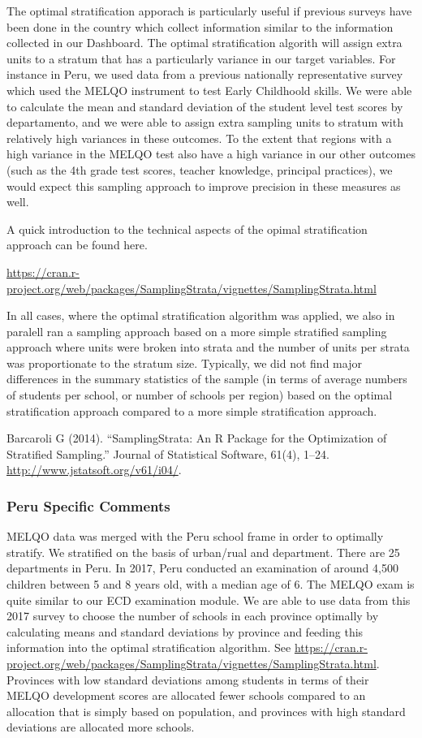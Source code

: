 \documentclass[]{article}
\begin{document}
The optimal stratification apporach is particularly useful if previous
surveys have been done in the country which collect information similar
to the information collected in our Dashboard. The optimal
stratification algorith will assign extra units to a stratum that has a
particularly variance in our target variables. For instance in Peru, we
used data from a previous nationally representative survey which used
the MELQO instrument to test Early Childhoold skills. We were able to
calculate the mean and standard deviation of the student level test
scores by departamento, and we were able to assign extra sampling units
to stratum with relatively high variances in these outcomes. To the
extent that regions with a high variance in the MELQO test also have a
high variance in our other outcomes (such as the 4th grade test scores,
teacher knowledge, principal practices), we would expect this sampling
approach to improve precision in these measures as well.

A quick introduction to the technical aspects of the opimal
stratification approach can be found here.

\url{https://cran.r-project.org/web/packages/SamplingStrata/vignettes/SamplingStrata.html}

In all cases, where the optimal stratification algorithm was applied, we
also in paralell ran a sampling approach based on a more simple
stratified sampling approach where units were broken into strata and the
number of units per strata was proportionate to the stratum size.
Typically, we did not find major differences in the summary statistics
of the sample (in terms of average numbers of students per school, or
number of schools per region) based on the optimal stratification
approach compared to a more simple stratification approach.

Barcaroli G (2014). ``SamplingStrata: An R Package for the Optimization
of Stratified Sampling.'' Journal of Statistical Software, 61(4), 1--24.
\url{http://www.jstatsoft.org/v61/i04/}.

\hypertarget{peru-specific-comments}{%
\subsubsection{Peru Specific Comments}\label{peru-specific-comments}}

MELQO data was merged with the Peru school frame in order to optimally
stratify. We stratified on the basis of urban/rual and department. There
are 25 departments in Peru. In 2017, Peru conducted an examination of
around 4,500 children between 5 and 8 years old, with a median age of 6.
The MELQO exam is quite similar to our ECD examination module. We are
able to use data from this 2017 survey to choose the number of schools
in each province optimally by calculating means and standard deviations
by province and feeding this information into the optimal stratification
algorithm. See
\url{https://cran.r-project.org/web/packages/SamplingStrata/vignettes/SamplingStrata.html}.
Provinces with low standard deviations among students in terms of their
MELQO development scores are allocated fewer schools compared to an
allocation that is simply based on population, and provinces with high
standard deviations are allocated more schools.
\end{document}
